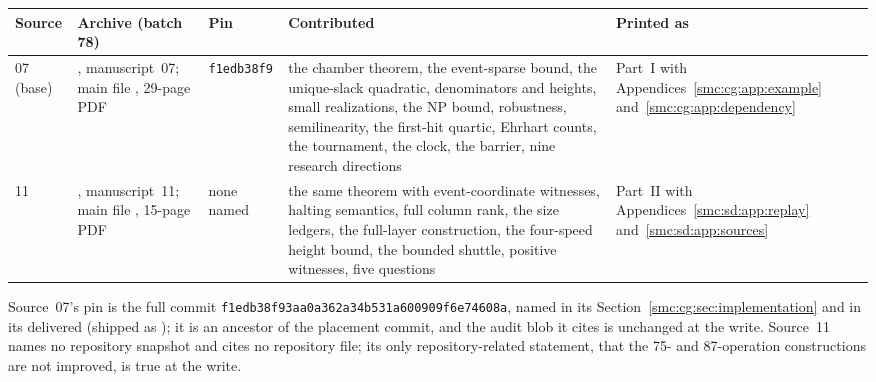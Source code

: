 \documentclass[11pt,letterpaper]{article}
\numberwithin{equation}{section}
\theoremstyle{definition}
\theoremstyle{remark}
\begin{document}
\begin{center}
\small
\begin{tabular}{@{}L{0.07\textwidth}L{0.26\textwidth}L{0.11\textwidth}L{0.26\textwidth}L{0.17\textwidth}@{}}
\toprule
Source & Archive (batch 78) & Pin & Contributed & Printed as\\
 (base) & , manuscript~07; main file , 29-page PDF & \texttt{f1edb38f9} & the chamber theorem, the event-sparse bound, the unique-slack quadratic, denominators and heights, small realizations, the NP bound, robustness, semilinearity, the first-hit quartic, Ehrhart counts, the tournament, the clock, the barrier, nine research directions & Part~I with Appendices~\ref{smc:cg:app:example} and~\ref{smc:cg:app:dependency}\\
11 & , manuscript~11; main file , 15-page PDF & none named & the same theorem with event-coordinate witnesses, halting semantics, full column rank, the size ledgers, the full-layer construction, the four-speed height bound, the bounded shuttle, positive witnesses, five questions & Part~II with Appendices~\ref{smc:sd:app:replay} and~\ref{smc:sd:app:sources}\\
\bottomrule
\end{tabular}
\end{center}

Source~07's pin is the full commit \texttt{f1edb38f93aa0a362a34b531a600909f6e74608a}, named in its Section~\ref{smc:cg:sec:implementation} and in its delivered  (shipped as ); it is an ancestor of the placement commit, and the audit blob it cites is unchanged at the write. Source~11 names no repository snapshot and cites no repository file; its only repository-related statement, that the 75- and 87-operation constructions are not improved, is true at the write.
\end{document}
